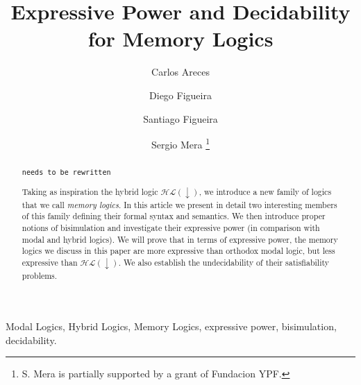 \documentclass{elsarticle}
\newcounter{tbsnr}
\newenvironment{tbs}
{\addtocounter{tbsnr}{1}\par\bigskip \noindent\fbox{\thetbsnr}
\hspace*{\fill}\begin{minipage}{12cm}\tt}
{\end{minipage}\hspace*{\fill}\bigskip}
\newcommand{\tb}[1]{\begin{tbs}{\footnotesize #1}\end{tbs}}
\newcommand{\down}{{\downarrow}}
\newlength{\esize}\settowidth{\esize}{\texttt{e}}
\newcommand{\HL}{\mathcal{HL}}
\begin{document}
\begin{frontmatter}
\title{Expressive Power and Decidability for Memory Logics}

\author[LORIA]       {Carlos Areces}
\author[CACHAN]      {Diego Figueira}
\author[UBA,CONICET] {Santiago Figueira}
\author[UBA]         {Sergio Mera \footnote{S. Mera is partially supported by a grant of Fundacion YPF.}}
\address[LORIA]      {INRIA Nancy Grand Est, France}
\address[CACHAN]     {LSV, ENS Cachan, CNRS, INRIA Saclay, France}
\address[UBA]        {Departamento de Computaci\'on, FCEyN\\Universidad de Buenos Aires, Argentina}
\address[CONICET]        {CONICET, Argentina}


\begin{abstract}
\tb{needs to be rewritten}
Taking as inspiration the hybrid logic $\HL(\down)$, we introduce a
new family of logics that we call \emph{memory logics}.  In this
article we present in detail two interesting members of this family
defining their formal syntax and semantics. We then introduce
proper notions of bisimulation and investigate their expressive power
(in comparison with modal and hybrid logics). We will prove that in
terms of expressive power, the memory logics we discuss in this
paper are more expressive than orthodox modal logic, but less
expressive than $\HL(\down)$. We also establish the undecidability
of their satisfiability problems.
\end{abstract}

\begin{keyword}
Modal Logics, Hybrid Logics, Memory Logics, expressive power, bisimulation,
decidability.
\end{keyword}
\end{frontmatter}







%
%




\end{document}
